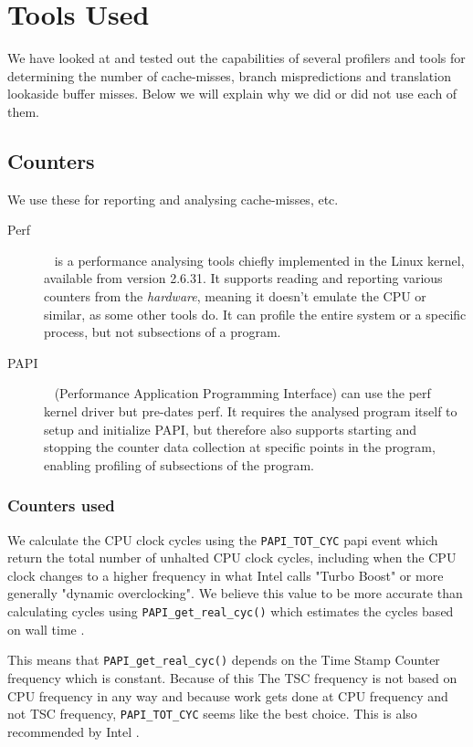 \section{Tools Used}
We have looked at and tested out the capabilities of several profilers and tools for determining the number of cache-misses, branch mispredictions and translation lookaside buffer misses.
Below we will explain why we did or did not use each of them.


\subsection{Counters}
We use these for reporting and analysing cache-misses, etc.
\begin{description}
\item[Perf]~\citep{perftool} is a performance analysing tools chiefly implemented in the Linux kernel, available from version 2.6.31.
It supports reading and reporting various counters from the \textit{hardware}, meaning it doesn't emulate the CPU or similar, as some other tools do.
It can profile the entire system or a specific process, but not subsections of a program.
\item[PAPI]~\citep{PAPI} (Performance Application Programming Interface) can use the perf kernel driver but pre-dates perf.
It requires the analysed program itself to setup and initialize PAPI, but therefore also supports starting and stopping the counter data collection at specific points in the program, enabling profiling of subsections of the program.
\end{description}

\subsubsection{Counters used}
We calculate the CPU clock cycles using the \texttt{PAPI\_TOT\_CYC} papi event which return the total number of unhalted CPU clock cycles, including when the CPU clock changes to a higher frequency in what Intel calls "Turbo Boost" or more generally "dynamic overclocking".
We believe this value to be more accurate than calculating cycles using \texttt{PAPI\_get\_real\_cyc()} which estimates the cycles based on wall time \citep{PAPI-get-real-cyc}. 

This means that \texttt{PAPI\_get\_real\_cyc()} depends on the Time Stamp Counter frequency which is constant. 
Because of this The TSC frequency is not based on CPU frequency in any way and because work gets done at CPU frequency and not TSC frequency, \texttt{PAPI\_TOT\_CYC} seems like the best choice. 
This is also recommended by Intel \citep{IntelMeasuringTheAverageUnhaltedFrequency}.

